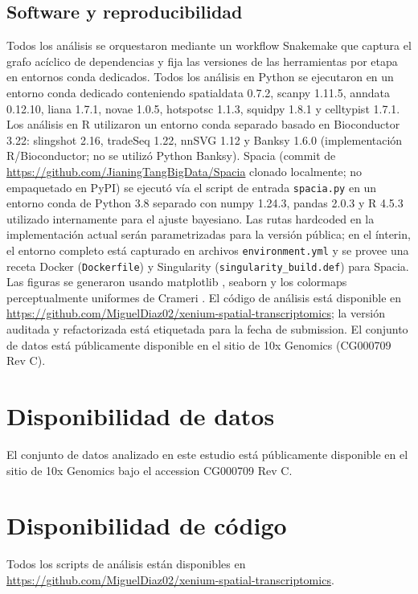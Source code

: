\documentclass[12pt,a4paper]{article}
\begin{document}
\subsection*{Software y reproducibilidad}
Todos los análisis se orquestaron mediante un workflow Snakemake \citep{molder2021snakemake} que captura el grafo acíclico de dependencias y fija las versiones de las herramientas por etapa en entornos conda dedicados. Todos los análisis en Python se ejecutaron en un entorno conda dedicado conteniendo spatialdata 0.7.2, scanpy 1.11.5, anndata 0.12.10, liana 1.7.1, novae 1.0.5, hotspotsc 1.1.3, squidpy 1.8.1 y celltypist 1.7.1. Los análisis en R utilizaron un entorno conda separado basado en Bioconductor 3.22: slingshot 2.16, tradeSeq 1.22, nnSVG 1.12 y Banksy 1.6.0 (implementación R/Bioconductor; no se utilizó Python Banksy). Spacia (commit de \url{https://github.com/JianingTangBigData/Spacia} clonado localmente; no empaquetado en PyPI) se ejecutó vía el script de entrada \texttt{spacia.py} en un entorno conda de Python 3.8 separado con numpy 1.24.3, pandas 2.0.3 y R 4.5.3 utilizado internamente para el ajuste bayesiano. Las rutas hardcoded en la implementación actual serán parametrizadas para la versión pública; en el ínterin, el entorno completo está capturado en archivos \texttt{environment.yml} y se provee una receta Docker (\texttt{Dockerfile}) y Singularity (\texttt{singularity\_build.def}) para Spacia. Las figuras se generaron usando matplotlib \citep{hunter2007matplotlib}, seaborn y los colormaps perceptualmente uniformes de Crameri \citep{crameri2023scientific}. El código de análisis está disponible en \url{https://github.com/MiguelDiaz02/xenium-spatial-transcriptomics}; la versión auditada y refactorizada está etiquetada para la fecha de submission. El conjunto de datos está públicamente disponible en el sitio de 10x Genomics (CG000709 Rev C).

\section*{Disponibilidad de datos}
El conjunto de datos analizado en este estudio está públicamente disponible en el sitio de 10x Genomics bajo el accession CG000709 Rev C.

\section*{Disponibilidad de código}
Todos los scripts de análisis están disponibles en \url{https://github.com/MiguelDiaz02/xenium-spatial-transcriptomics}.
\end{document}
